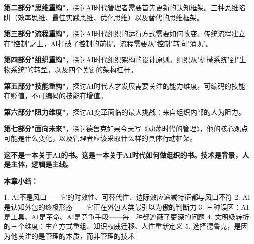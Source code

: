 \textbf{第二部分"思维重构"}，探讨AI时代管理者需要首先更新的认知框架。三种思维陷阱（效率思维、最佳实践思维、优化思维）以及替代的思维框架。

\textbf{第三部分"流程重构"}，探讨AI时代组织的运行方式需要如何改变。传统流程建立在"控制"之上，AI打破了控制的前提，流程需要从"控制"转向"涌现"。

\textbf{第四部分"组织重构"}，探讨AI时代组织架构的设计原则。组织从"机械系统"到"生物系统"的转型，以及四个关键的架构杠杆。

\textbf{第五部分"技能重构"}，探讨AI时代人才发展需要关注的能力维度。可编码的技能在贬值，不可编码的技能在增值。

\textbf{第六部分"阻力维度"}，探讨AI变革面临的最大挑战：来自组织内部的人为阻力。

\textbf{第七部分"面向未来"}，探讨德鲁克如果今天写《动荡时代的管理》，他的核心观点可能是什么变化，以及管理者应该采取什么样的具体行动框架。

\textbf{这不是一本关于AI的书。这是一本关于AI时代如何做组织的书。技术是背景，人是主体，逻辑是主线。}


\textbf{本章小结：}

1. AI不是风口——它的时效性、可替代性、边际效应递减特征都与风口不符
2. AI是认知外包的终极形态——它正在外包人类最引以为傲的判断力
3. 三种误区：AI是工具、AI是革命、AI是竞争手段——每一种都遮蔽了更深的问题
4. 文明级转折的三个维度：生产方式重组、知识权威迁移、人性重新定义
5. 选择德鲁克，是因为他关注的是管理的本质，而非管理的技术
